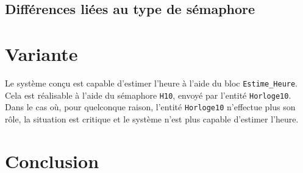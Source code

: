 \documentclass[french]{article}
\begin{document}
	\subsection{Différences liées au type de sémaphore}
	
	
	
	\section{Variante}
	
	Le système conçu est capable d'estimer l'heure à l'aide du bloc \texttt{Estime\_Heure}. Cela est réalisable à l'aide du sémaphore \texttt{H10}, envoyé par l'entité \texttt{Horloge10}. Dans le cas où, pour quelconque raison, l'entité \texttt{Horloge10} n'effectue plus son rôle, la situation est critique et le système n'est plus capable d'estimer l'heure.

	\section{Conclusion}

	
\end{document}
